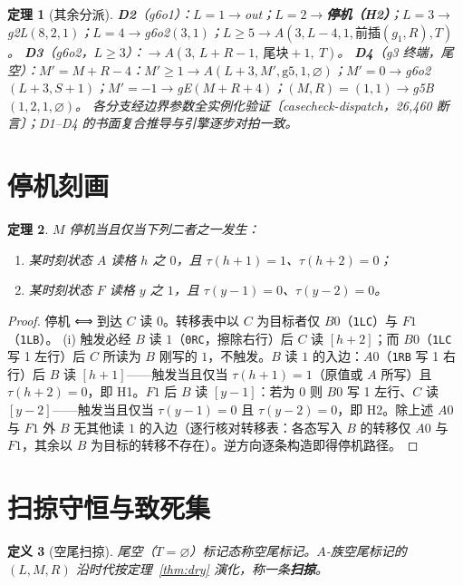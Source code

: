 \documentclass[11pt]{ctexart}
\newtheorem{theorem}{定理}[section]
\newtheorem{definition}[theorem]{定义}
\begin{document}
\begin{theorem}[其余分派]\label{thm:dispatch}
\textbf{D2}（g6o1）：$L=1\to$out；$L=2\to$\textbf{停机（H2）}；$L=3\to$g2L$(8,2,1)$；$L=4\to$g6o2$(3,1)$；$L\ge5\to A(3,L{-}4,1,\text{前插}(g_1,R),T)$。
\textbf{D3}（g6o2，$L\ge3$）：$\to A(3,\,L{+}R{-}1,\ \text{尾块}{+}1,\ T)$。
\textbf{D4}（g3 终端，尾空）：$M'=M{+}R{-}4$：$M'\ge1\to A(L{+}3,M',\mathrm{g5},1,\varnothing)$；$M'=0\to$g6o2$(L{+}3,S{+}1)$；$M'=-1\to$gE$(M{+}R{+}4)$；$(M,R)=(1,1)\to$g5B$(1,2,1,\varnothing)$。
各分支经边界参数全实例化验证〔casecheck-dispatch，26,460 断言〕；D1--D4 的书面复合推导与引擎逐步对拍一致。
\end{theorem}

\section{停机刻画}

\begin{theorem}\label{thm:H}
$M$ 停机当且仅当下列二者之一发生：
\begin{enumerate}
\item[\textbf{(H1)}] 某时刻状态 $A$ 读格 $h$ 之 $0$，且 $\tau(h{+}1)=1$、$\tau(h{+}2)=0$；
\item[\textbf{(H2)}] 某时刻状态 $F$ 读格 $y$ 之 $1$，且 $\tau(y{-}1)=0$、$\tau(y{-}2)=0$。
\end{enumerate}
\end{theorem}
\begin{proof}
停机 ⟺ 到达 $C$ 读 $0$。转移表中以 $C$ 为目标者仅 $B0$（\texttt{1LC}）与 $F1$（\texttt{1LB}）。
(i) 触发必经 $B$ 读 $1$（\texttt{0RC}，擦除右行）后 $C$ 读 $[h{+}2]$；而 $B0$（\texttt{1LC} 写 1 左行）后 $C$ 所读为 $B$ 刚写的 $1$，不触发。$B$ 读 $1$ 的入边：$A0$（\texttt{1RB} 写 1 右行）后 $B$ 读 $[h{+}1]$——触发当且仅当 $\tau(h{+}1)=1$（原值或 $A$ 所写）且 $\tau(h{+}2)=0$，即 H1。$F1$ 后 $B$ 读 $[y{-}1]$：若为 $0$ 则 $B0$ 写 1 左行、$C$ 读 $[y{-}2]$——触发当且仅当 $\tau(y{-}1)=0$ 且 $\tau(y{-}2)=0$，即 H2。除上述 $A0$ 与 $F1$ 外 $B$ 无其他读 $1$ 的入边（逐行核对转移表：各态写入 $B$ 的转移仅 $A0$ 与 $F1$，其余以 $B$ 为目标的转移不存在）。逆方向逐条构造即得停机路径。
\end{proof}

\section{扫掠守恒与致死集}

\begin{definition}[空尾扫掠]
尾空（$T=\varnothing$）标记态称空尾标记。$A$-族空尾标记的 $(L,M,R)$ 沿时代按定理~\ref{thm:dry} 演化，称一条\textbf{扫掠}。
\end{definition}
\end{document}
